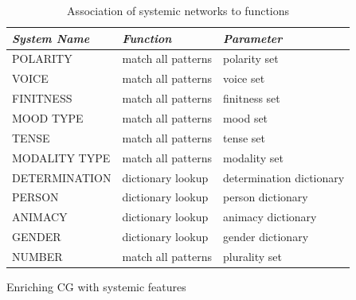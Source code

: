 \begin{table}[!ht]
    \centering
    \begin{tabulary}{\textwidth}{|L|L|L|}
        \hline
        \textit{System Name} & \textit{Function}   & \textit{Parameter} \\ \hline
        POLARITY             & match all patterns& polarity set                  \\ \hline
        VOICE                & match all patterns& voice set                   \\ \hline
        FINITNESS            & match all patterns& finitness set                 \\ \hline
        MOOD TYPE            & match all patterns& mood set                      \\ \hline
        TENSE                & match all patterns& tense set                     \\ \hline
        MODALITY TYPE        & match all patterns& modality set                  \\ \hline
        DETERMINATION        & dictionary lookup & determination dictionary           \\ \hline
        PERSON               & dictionary lookup & person dictionary                  \\ \hline
        ANIMACY              & dictionary lookup & animacy dictionary                 \\ \hline
        GENDER               & dictionary lookup & gender dictionary                  \\ \hline
        NUMBER               & match all patterns& plurality set                 \\ \hline
    \end{tabulary}
    \caption{Association of systemic networks to functions}
    \label{tab:system-to-function-mapping}
\end{table}


\begin{algorithm}[!ht]
    \Input {\cg} %
    \caption{Enriching CG with systemic features}
    \label{alg:enrich-cg}
\end{algorithm}

